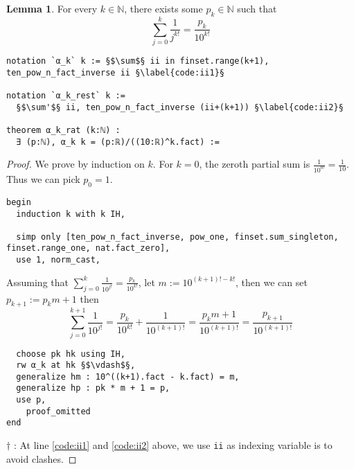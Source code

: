 \documentclass{report}
\theoremstyle{definition}
\newtheorem{lemma}{Lemma}[section]
\theoremstyle{plain}
\begin{document}
\begin{lemma}\label{lemma:partialSum}
For every $k\in\mathbb N$, there exists some $p_k\in\mathbb N$ such that
$$
\sum_{j=0}^k\frac1{j^{k!}}=\frac{p_k}{10^{k!}}
$$
\begin{verbatim}
notation `α_k` k := §$\sum$§ ii in finset.range(k+1), ten_pow_n_fact_inverse ii §\label{code:ii1}§

notation `α_k_rest` k := 
  §$\sum'$§ ii, ten_pow_n_fact_inverse (ii+(k+1)) §\label{code:ii2}§

theorem α_k_rat (k:ℕ) : 
  ∃ (p:ℕ), α_k k = (p:ℝ)/((10:ℝ)^k.fact) :=
\end{verbatim}
\end{lemma}

\begin{proof}
We prove by induction on $k$. For $k=0$, the zeroth partial sum is $\frac1{10^{0!}}=\frac1{10}$. Thus we can pick $p_0=1$.

\begin{verbatim}
begin
  induction k with k IH,

  simp only [ten_pow_n_fact_inverse, pow_one, finset.sum_singleton, finset.range_one, nat.fact_zero], 
  use 1, norm_cast, 
\end{verbatim}

Assuming that $\sum_{j=0}^k\frac1{10^{j!}}=\frac{p_k}{10^{k!}}$, let $m:=10^{(k+1)!-k!}$, then we can set $p_{k+1}:=p_k m+1$ then
$$
\sum_{j=0}^{k+1}\frac1{10^{j!}}=\frac{p_k}{10^{k!}}+\frac1{10^{(k+1)!}}=\frac{p_km+1}{10^{(k+1)!}}=\frac{p_{k+1}}{10^{(k+1)!}}
$$
\begin{verbatim}                                                                            
  choose pk hk using IH,
  rw α_k at hk §$\vdash$§,
  generalize hm : 10^((k+1).fact - k.fact) = m,
  generalize hp : pk * m + 1 = p,
  use p,
    proof_omitted
end
\end{verbatim}
$\dagger$ : At line \ref{code:ii1} and \ref{code:ii2} above, we use {\tt ii} as indexing variable is to avoid clashes.
\end{proof}
\end{document}
